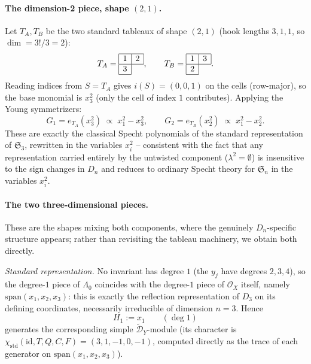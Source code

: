 \documentclass[11pt,a4paper]{article}
\begin{document}
\paragraph{The dimension-2 piece, shape $(2,1)$.}
Let $T_A,T_B$ be the two standard tableaux of shape $(2,1)$ (hook
lengths $3,1,1$, so $\dim=3!/3=2$):
\[
  T_A = \begin{array}{|c|c|}\hline 1&2\\\hline 3\\\cline{1-1}\end{array},
  \qquad
  T_B = \begin{array}{|c|c|}\hline 1&3\\\hline 2\\\cline{1-1}\end{array}.
\]
Reading indices from $S=T_A$ gives
$i(S)=(0,0,1)$ on the cells (row-major), so the base monomial is
$x_3^{2}$ (only the cell of index $1$ contributes). Applying the Young
symmetrizers:
\[
 G_1 = e_{T_A}(x_3^2) \;\propto\; x_1^2 - x_3^2,
 \qquad
 G_2 = e_{T_B}(x_2^2) \;\propto\; x_1^2 - x_2^2.
\]
These are exactly the classical Specht polynomials of the standard
representation of $\mathfrak{S}_3$, rewritten in the variables
$x_i^2$ -- consistent with the fact that any representation carried
entirely by the untwisted component ($\lambda^2=\emptyset$) is
insensitive to the sign changes in $D_n$ and reduces to ordinary
Specht theory for $\mathfrak{S}_n$ in the variables $x_i^2$.

\paragraph{The two three-dimensional pieces.} These are the shapes
mixing both components, where the genuinely $D_n$-specific structure
appears; rather than revisiting the tableau machinery, we obtain both
directly.

\emph{Standard representation.} No invariant has degree $1$ (the
$y_j$ have degrees $2,3,4$), so the degree-$1$ piece of $\Lambda_0$
coincides with the degree-$1$ piece of $\mathcal{O}_X$ itself, namely
$\mathrm{span}(x_1,x_2,x_3)$: this is exactly the reflection
representation of $D_3$ on its defining coordinates, necessarily
irreducible of dimension $n=3$. Hence
\[
  H_1 := x_1 \qquad (\deg 1)
\]
generates the corresponding simple $\widetilde{\mathcal{D}}_Y$-module
(its character is $\chi_{\mathrm{std}}(\mathrm{id},T,Q,C,F) = (3,1,-1,0,-1)$,
computed directly as the trace of each generator on
$\mathrm{span}(x_1,x_2,x_3)$).
\end{document}
